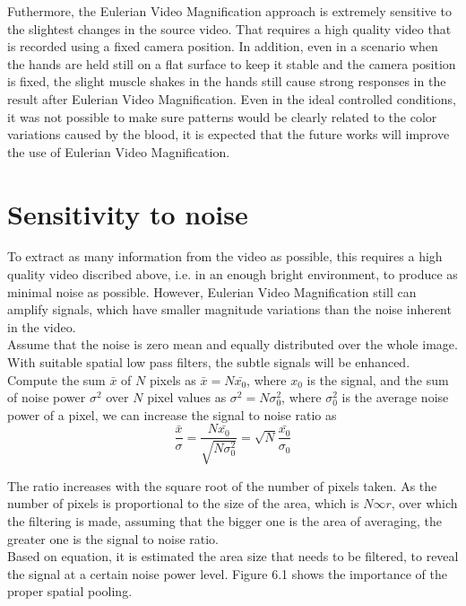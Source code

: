 Futhermore, the Eulerian Video Magnification approach is extremely sensitive to the slightest changes in the source video. That requires a high quality video that is recorded using a fixed camera position. In addition, even in a scenario when the hands are held still on a flat surface to keep it stable and the camera position is fixed, the slight muscle shakes in the hands still cause strong responses in the result after Eulerian Video Magnification. Even in the ideal controlled conditions, it was not possible to make sure patterns would be clearly related to the color variations caused by the blood, it is expected that the future works will improve the use of Eulerian Video Magnification.\\

\section{Sensitivity to noise}

To extract as many information from the video as possible, this requires a high quality video discribed above, i.e. in an enough bright environment, to produce as minimal noise as possible. However, Eulerian Video Magnification still can amplify signals, which have smaller magnitude variations than the noise inherent in the video.\\

Assume that the noise is zero mean and equally distributed over the whole image. With suitable spatial low pass filters, the subtle signals will be enhanced. Compute the sum $\bar{x}$ of $N$ pixels as $\bar{x}=N\bar{x_{0}}$, where $x_{0}$ is the signal, and the sum of noise
power $\sigma ^{2}$ over $N$ pixel values as $\sigma ^{2}=N\sigma_{0} ^{2}$, where $\sigma_{0} ^{2}$ is the average noise power of a pixel,
we can increase the signal to noise ratio as\\
\begin{displaymath}
\frac{\bar{x}}{\sigma }=\frac{N\bar{x_{0}}}{\sqrt{N\sigma _{0}^{2}}}=\sqrt{N}\frac{\bar{x_{0}}}{\sigma_{0} }
\end{displaymath}

The ratio increases with the square root of the number of pixels taken.
As the number of pixels is proportional to the size of the area, which is $N\infty r$, over which the filtering is made, assuming that the bigger one is the area of averaging, the greater one is the signal to noise ratio.\\

Based on equation, it is estimated the area size that needs to be filtered, to reveal the signal at a certain noise power level. Figure 6.1 shows the importance of the proper spatial pooling.

